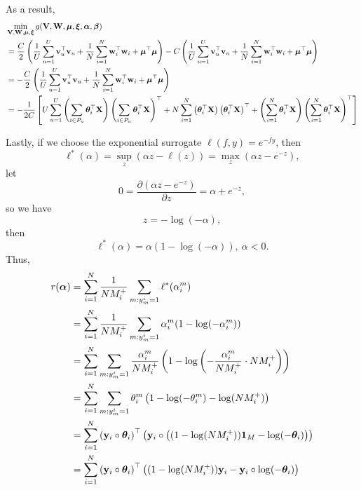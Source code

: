 As a result,
\begin{equation}
\label{eq:gmin}
\begin{aligned}
&\min_{\mathbf{V}, \mathbf{W}, \bm{\mu}, \bm{\xi}} g(\mathbf{V}, \mathbf{W}, \bm{\mu}, \bm{\xi}, {\bm{\alpha}}, {\bm{\beta}}) \\
&= \frac{C}{2} \left( \frac{1}{U} \sum_{u=1}^U \mathbf{v}_u^\top \mathbf{v}_u 
     + \frac{1}{N} \sum_{i=1}^N \mathbf{w}_i^\top \mathbf{w}_i + \bm{\mu}^\top \bm{\mu} \right)
     -C \left( \frac{1}{U} \sum_{u=1}^U \mathbf{v}_u^\top \mathbf{v}_u + \frac{1}{N} \sum_{i=1}^N \mathbf{w}_i^\top \mathbf{w}_i + \bm{\mu}^\top \bm{\mu} \right) \\
&= -\frac{C}{2} \left( \frac{1}{U} \sum_{u=1}^U \mathbf{v}_u^\top \mathbf{v}_u + \frac{1}{N} \sum_{i=1}^N \mathbf{w}_i^\top \mathbf{w}_i + \bm{\mu}^\top \bm{\mu} \right) \\
&= -\frac{1}{2 C} \left[
     U \sum_{u=1}^U \left( \sum_{i \in P_u} \bm{\theta}_i^\top \mathbf{X} \right) \left( \sum_{i \in P_u} \bm{\theta}_i^\top \mathbf{X} \right)^\top
   + N \sum_{i=1}^N \left( \bm{\theta}_i^\top \mathbf{X} \right) \left( \bm{\theta}_i^\top \mathbf{X} \right)^\top
   + \left( \sum_{i=1}^N \bm{\theta}_i^\top \mathbf{X} \right) \left( \sum_{i=1}^N \bm{\theta}_i^\top \mathbf{X} \right)^\top \right]
\end{aligned}
\end{equation}

Lastly, if we choose the exponential surrogate $\ell(f, y) = e^{-fy}$, then
\begin{equation*}
\ell^*(\alpha) = \sup_z \left(\alpha z - \ell(z) \right) = \max_z \left(\alpha z - e^{-z} \right),
\end{equation*}
let 
\begin{equation*}
0 = \frac{\partial (\alpha z - e^{-z})}{\partial z} = \alpha + e^{-z},
\end{equation*}
so we have
\begin{equation*}
z = -\log(-\alpha),
\end{equation*}
then
\begin{equation*}
\ell^*(\alpha) = \alpha ( 1 - \log(-\alpha) ), \ \alpha < 0.
\end{equation*}
Thus,
\begin{equation}
\label{eq:expconj}
\begin{aligned}
r({\bm{\alpha}})
&= \sum_{i=1}^N \frac{1}{N M_i^+} \sum_{m: y_m^i = 1} \ell^*(\alpha_i^m) \\
&= \sum_{i=1}^N \frac{1}{N M_i^+} \sum_{m: y_m^i = 1} \alpha_i^m (1 - \log(-\alpha_i^m)) \\
&= \sum_{i=1}^N \sum_{m: y_m^i = 1} \frac{\alpha_i^m}{N M_i^+} \left(1 - \log \left( -\frac{\alpha_i^m}{N M_i^+} \cdot N M_i^+ \right) \right) \\
&= \sum_{i=1}^N \sum_{m: y_m^i = 1} \theta_i^m \left(1 - \log(-\theta_i^m) - \log(N M_i^+) \right) \\
&= \sum_{i=1}^N \left( \mathbf{y}_i \circ \bm{\theta}_i \right)^\top 
                \left( \mathbf{y}_i \circ \left( (1 - \log(N M_i^+)) \mathbf{1}_M - \log(-\bm{\theta}_i) \right) \right) \\
&= \sum_{i=1}^N \left( \mathbf{y}_i \circ \bm{\theta}_i \right)^\top 
                \left( (1 - \log(N M_i^+)) \mathbf{y}_i - \mathbf{y}_i \circ \log(-\bm{\theta}_i) \right)
\end{aligned}
\end{equation}

